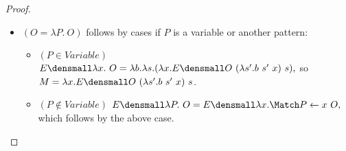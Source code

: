 \begin{proof}
\begin{enumerate}[(a)]
\begin{itemize}
\begin{itemize}
      \end{itemize}
    \item $(O = \lambda P. ~O)$ follows by cases if $P$ is a variable or another pattern:
      \begin{itemize}
      \item $(P \in \mathit{Variable})$
        \begin{math}
          E\den{\lambda x. ~O}
          =
          \lambda b. \lambda s.
          (\lambda x. E\den{O} ~ (\lambda s'. b ~ s' ~ x) ~ s)
          ,
        \end{math}
        so
        \\
        $M = \lambda x. E\den{O} ~ (\lambda s'. b ~ s' ~ x) ~ s$.
      \item $(P \notin \mathit{Variable})$
      \begin{math}
        E\den{\lambda P. ~O}
        =
        E\den{\lambda x. \Match P \gets x ~ O}
        ,
      \end{math}
      which follows by the above case.
      \end{itemize}

\end{itemize}
\end{enumerate}
\end{proof}
